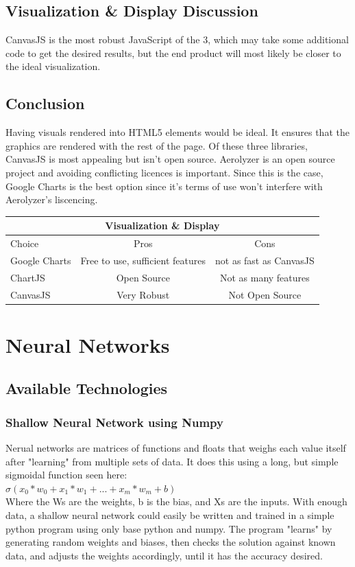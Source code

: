 \documentclass[onecolumn, draftclsnofoot,10pt, compsoc]{IEEEtran}
\begin{document}
\begin{singlespace}
\subsection{Visualization \& Display Discussion}
CanvasJS is the most robust JavaScript of the 3, which may take some additional code to get the desired results, but the end product will most likely be closer to the ideal visualization. \cite{CanvasJS}
\subsection{Conclusion}
Having visuals rendered into HTML5 elements would be ideal.
It ensures that the graphics are rendered with the rest of the page.
Of these three libraries, CanvasJS is most appealing but isn't open source.
Aerolyzer is an open source project and avoiding conflicting licences is important.
Since this is the case, Google Charts is the best option since it's terms of use won't interfere with Aerolyzer's liscencing.\cite{GoogleCh}\cite{CanvasJS}
\begin{center}
	\begin{tabular}{|l|c|c|} 
		\hline
		\multicolumn{3}{|c|}{Visualization \& Display} \\
		\hline
		Choice & Pros & Cons\\ [0.5ex] 
		\hline\hline
		Google Charts & Free to use, sufficient features & not as fast as CanvasJS \\ 
		\hline
		ChartJS & Open Source & Not as many features\\
		\hline
		CanvasJS & Very Robust & Not Open Source\\ [1ex] 
		\hline
	\end{tabular}
\end{center}

\section{Neural Networks}
\subsection{Available Technologies}
\subsubsection{Shallow Neural Network using Numpy}
Nerual networks are matrices of functions and floats that weighs each value itself after "learning" from multiple sets of data. It does this using a long, but simple sigmoidal function seen here:\\
$\sigma(x_0*w_0 + x_1*w_1 + ... + x_m*w_m + b)$\cite{nn}\\
Where the Ws are the weights, b is the bias, and Xs are the inputs. 
With enough data, a shallow neural network could easily be written and trained in a simple python program using only base python and numpy. The program "learns" by generating random weights and biases, then checks the solution against known data, and adjusts the weights accordingly, until it has the accuracy desired. 


\end{singlespace}
\end{document}
